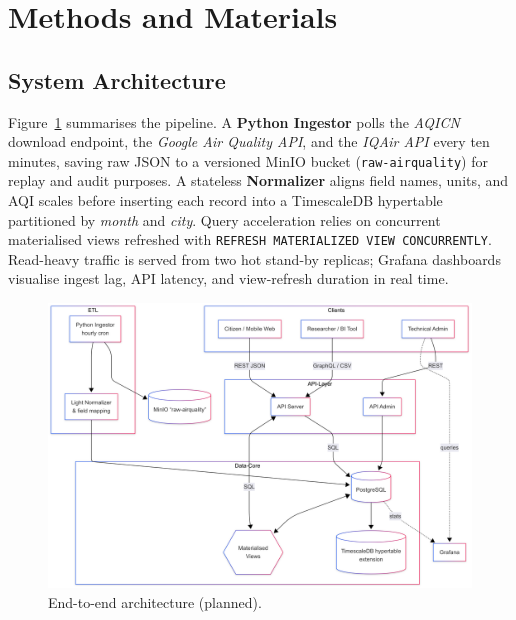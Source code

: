 \section{Methods and Materials}\label{sec:methods}

\subsection{System Architecture}\label{subsec:architecture}
Figure~\ref{fig:architecture} summarises the pipeline.  
A \textbf{Python Ingestor} polls the \textit{AQICN} download endpoint, the \textit{Google Air Quality API}, and the \textit{IQAir API} every ten minutes, saving raw JSON to a versioned MinIO bucket (\texttt{raw-airquality}) for replay and audit purposes\cite{minio,aqicnhist,googleair,iqair}.  
A stateless \textbf{Normalizer} aligns field names, units, and AQI scales before inserting each record into a TimescaleDB hypertable partitioned by \textit{month} and \textit{city}\cite{timescale}.  
Query acceleration relies on concurrent materialised views refreshed with \texttt{REFRESH MATERIALIZED VIEW CONCURRENTLY}\cite{postgsmv}.  
Read-heavy traffic is served from two hot stand-by replicas; Grafana dashboards visualise ingest lag, API latency, and view-refresh duration in real time\cite{grafana}.  

\begin{figure}[tb]
  \centering
  \includegraphics[width=\linewidth]{Pictures/fig1_architecture.png}
  \caption{End-to-end architecture (planned).}
  \label{fig:architecture}
\end{figure}


